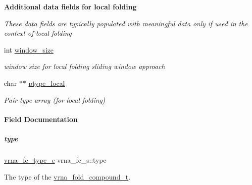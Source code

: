 \begin{Indent}\textbf{ Additional data fields for local folding}\par
{\em These data fields are typically populated with meaningful data only if used in the context of local folding }\begin{DoxyCompactItemize}
\item 
\mbox{\label{group__fold__compound_adacbf7cdfb47d3072683ab509de735f6}} 
int \hyperlink{group__fold__compound_adacbf7cdfb47d3072683ab509de735f6}{window\+\_\+size}
\begin{DoxyCompactList}\small\item\em window size for local folding sliding window approach \end{DoxyCompactList}\item 
\mbox{\label{group__fold__compound_a2ecb8ff5e21190936a8a146be7a251ff}} 
char $\ast$$\ast$ \hyperlink{group__fold__compound_a2ecb8ff5e21190936a8a146be7a251ff}{ptype\+\_\+local}
\begin{DoxyCompactList}\small\item\em Pair type array (for local folding) \end{DoxyCompactList}\end{DoxyCompactItemize}
\end{Indent}


\paragraph{Field Documentation}
\mbox{\label{group__fold__compound_ac5eab693deac9a1a40c2a95ac294707c}} 
\subparagraph{\texorpdfstring{type}{type}}
{\footnotesize\ttfamily \hyperlink{group__fold__compound_ga01a4ff86fa71deaaa5d1abbd95a1447d}{vrna\+\_\+fc\+\_\+type\+\_\+e} vrna\+\_\+fc\+\_\+s\+::type}



The type of the \hyperlink{group__fold__compound_ga1b0cef17fd40466cef5968eaeeff6166}{vrna\+\_\+fold\+\_\+compound\+\_\+t}. 

